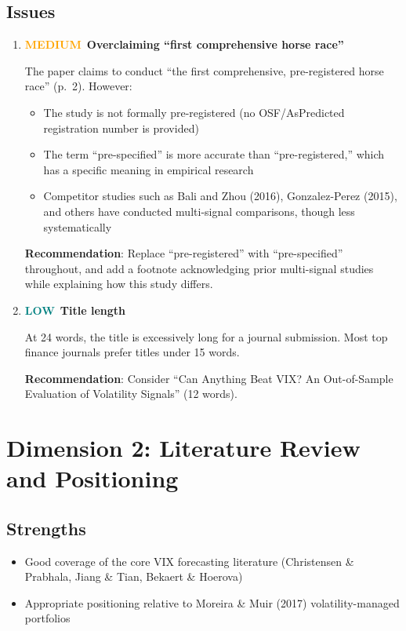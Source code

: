 \documentclass[12pt,a4paper]{article}
\newcommand{\MEDIUM}{\textcolor{orange}{\textbf{MEDIUM}}}
\newcommand{\LOW}{\textcolor{teal}{\textbf{LOW}}}
\begin{document}
\subsection*{Issues}

\begin{enumerate}[label=D1.\arabic*]

\item \MEDIUM\ \textbf{Overclaiming ``first comprehensive horse race''}

The paper claims to conduct ``the first comprehensive, pre-registered horse race'' (p.~2). However:
\begin{itemize}
    \item The study is not formally pre-registered (no OSF/AsPredicted registration number is provided)
    \item The term ``pre-specified'' is more accurate than ``pre-registered,'' which has a specific meaning in empirical research
    \item Competitor studies such as Bali and Zhou (2016), Gonzalez-Perez (2015), and others have conducted multi-signal comparisons, though less systematically
\end{itemize}
\textbf{Recommendation}: Replace ``pre-registered'' with ``pre-specified'' throughout, and add a footnote acknowledging prior multi-signal studies while explaining how this study differs.

\item \LOW\ \textbf{Title length}

At 24 words, the title is excessively long for a journal submission. Most top finance journals prefer titles under 15 words.

\textbf{Recommendation}: Consider ``Can Anything Beat VIX? An Out-of-Sample Evaluation of Volatility Signals'' (12 words).

\end{enumerate}


\section{Dimension 2: Literature Review and Positioning}
\label{sec:d2}

\subsection*{Strengths}
\begin{itemize}
    \item Good coverage of the core VIX forecasting literature (Christensen \& Prabhala, Jiang \& Tian, Bekaert \& Hoerova)
    \item Appropriate positioning relative to Moreira \& Muir (2017) volatility-managed portfolios
\end{itemize}
\end{document}
